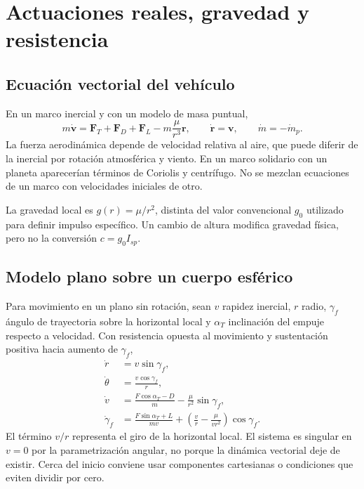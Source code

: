 \chapter{Actuaciones reales, gravedad y resistencia}\label{ch:27}
\section{Ecuación vectorial del vehículo}
En un marco inercial y con un modelo de masa puntual,
\begin{equation}\label{eq:trajectoryvector}
 m\dot{\mathbf v}=\mathbf F_T+\mathbf F_D+\mathbf F_L
 -m\frac{\mu}{r^3}\mathbf r,\qquad
 \dot{\mathbf r}=\mathbf v,\qquad \dot m=-\dot m_p.
\end{equation}
La fuerza aerodinámica depende de velocidad relativa al aire, que puede diferir de la inercial por rotación atmosférica y viento. En un marco solidario con un planeta aparecerían términos de Coriolis y centrífugo. No se mezclan ecuaciones de un marco con velocidades iniciales de otro.

La gravedad local es $g(r)=\mu/r^2$, distinta del valor convencional $g_0$ utilizado para definir impulso específico. Un cambio de altura modifica gravedad física, pero no la conversión $c=g_0I_{sp}$.
\section{Modelo plano sobre un cuerpo esférico}
Para movimiento en un plano sin rotación, sean $v$ rapidez inercial, $r$ radio, $\gamma_f$ ángulo de trayectoria sobre la horizontal local y $\alpha_T$ inclinación del empuje respecto a velocidad. Con resistencia opuesta al movimiento y sustentación positiva hacia aumento de $\gamma_f$,
\begin{align}
 \dot r&=v\sin\gamma_f,\\
 \dot\theta&=\frac{v\cos\gamma_f}{r},\\
 \dot v&=\frac{F\cos\alpha_T-D}{m}-\frac{\mu}{r^2}\sin\gamma_f,\label{eq:vdot}\\
 \dot\gamma_f&=\frac{F\sin\alpha_T+L}{mv}
 +\left(\frac{v}{r}-\frac{\mu}{vr^2}\right)\cos\gamma_f.
\end{align}
El término $v/r$ representa el giro de la horizontal local. El sistema es singular en $v=0$ por la parametrización angular, no porque la dinámica vectorial deje de existir. Cerca del inicio conviene usar componentes cartesianas o condiciones que eviten dividir por cero.\cite{MIT32,MIT33}

